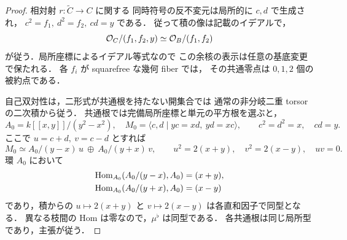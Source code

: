 \begin{proof}
相対射 $r:\widetilde C\to C$ に関する
同時符号の反不変元は局所的に $c,d$ で生成され，
$c^2=f_1,\ d^2=f_2,\ cd=y$ である．
従って積の像は記載のイデアルで，
\[
 \mathcal O_C/(f_1,f_2,y)
 \simeq\mathcal O_B/(f_1,f_2)
\]
が従う．局所座標によるイデアル等式なので
この余核の表示は任意の基底変更で保たれる．
各 $f_i$ が squarefree な幾何 fiber では，
その共通零点は $0,1,2$ 個の被約点である．

自己双対性は，二形式が共通根を持たない開集合では
通常の非分岐二重 torsor の二次積から従う．
共通根では完備局所座標と単元の平方根を選ぶと，
\[
 A_0=k[[x,y]]/(y^2-x^2),\quad
 M_0=\langle c,d\mid yc=xd,\ yd=xc\rangle,
 \qquad c^2=d^2=x,\quad cd=y .
\]
ここで $u=c+d,\ v=c-d$ とすれば
\[
  M_0\simeq A_0/(y-x)\,u
          \ \oplus\ A_0/(y+x)\,v,
  \qquad u^2=2(x+y),\quad
  v^2=2(x-y),\quad uv=0.                 \tag{Node-M}
\]
環 $A_0$ において
\[
 \begin{split}
  \operatorname{Hom}_{A_0}(A_0/(y-x),A_0)&=(x+y),\\
  \operatorname{Hom}_{A_0}(A_0/(y+x),A_0)&=(x-y)
 \end{split}
\]
であり，積からの $u\mapsto 2(x+y)$ と
$v\mapsto2(x-y)$ は各直和因子で同型となる．
異なる枝間の Hom は零なので，$\mu^\flat$ は同型である．
各共通根は同じ局所型であり，主張が従う．
\end{proof}

